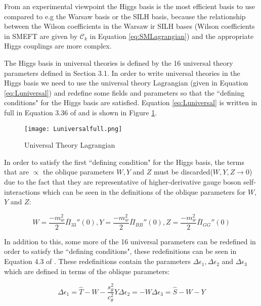 \documentclass[11pt,oneside,a4paper]{article}
\begin{document}
From an experimental viewpoint the Higgs basis is the most efficient basis to use compared to e.g the Warsaw basis or the SILH basis, because the relationship between the Wilson coefficients in the Warsaw ir SILH bases (Wilson coefficients in SMEFT are given by $\mathcal{C}_{k}$ in Equation \ref{eq:SMLagrangian}) and the appropriate Higgs couplings are more complex. 


The Higgs basis in universal theories is defined by the 16 universal theory parameters defined in Section 3.1. In order to write universal theories in the Higgs basis we need to use the universal theory Lagrangian (given in Equation \ref{eq:Luniversal}) and redefine some fields and parameters so that the ``defining conditions" for the Higgs basis are satisfied. Equation \ref{eq:Luniversal} is written in full in Equation 3.36 of \cite{universal} and is shown in Figure \ref{fig:Luniversalfull}.

\begin{figure}[H]
	\texttt{[image: Luniversalfull.png]}
	\caption{Universal Theory Lagrangian}
	\label{fig:Luniversalfull}
\end{figure}

In order to satisfy the first ``defining condition" for the Higgs basis, the terms that are $\propto$ the oblique parameters $W,Y$ and $Z$ must be discarded($W,Y,Z \rightarrow 0$) due to the fact that they are representative of higher-derivative gauge boson self-interactions which can be seen in the definitions of the oblique parameters for $W$, $Y$ and $Z$:

\begin{equation}
W = \frac{-m^2_{w}}{2}\bar{\Pi}_{33}''(0),
Y = \frac{-m^2_{w}}{2}\bar{\Pi}_{BB}''(0),
Z = \frac{-m^2_{w}}{2}\bar{\Pi}_{GG}''(0)
\end{equation}

In addition to this, some more of the 16 universal parameters can be redefined in order to satisfy the ``defining conditions", these redefinitions can be seen in Equation 4.3 of \cite{universal}. These redefinitions contain the parameters $\Delta\epsilon_{1}, \Delta\epsilon_{2}$ and $\Delta\epsilon_{3}$ which are defined in terms of the oblique parameters:

\begin{equation}
\label{eq:obliquehiggs}
\Delta\epsilon_{1} = \hat{T} -W - \frac{s^2_{\theta}}{c^2_{\theta}}Y
\Delta\epsilon_{2} = -W
\Delta\epsilon_{3} = \hat{S} - W - Y
\end{equation}
\end{document}

